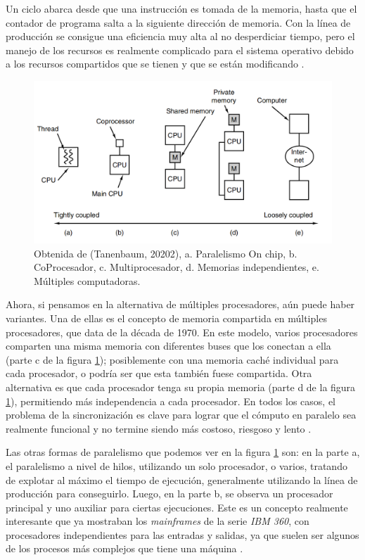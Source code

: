 \documentclass[letterpaper,12pt,oneside]{book}
\begin{document}
        Un ciclo abarca desde que una instrucción es tomada de la memoria, hasta que el contador
		de programa salta a la siguiente dirección de memoria. Con la línea de producción se consigue una eficiencia muy alta al no desperdiciar tiempo, pero el manejo de los recursos es realmente complicado para el sistema operativo debido a los recursos compartidos que
		se tienen y que se están modificando \cite[p.421]{null_essentials_2003}.
		
		\begin{figure}[h]
 			\centering
			\includegraphics[scale=0.3]{media/ParalelismoTanenbaun.png}
			\caption{Obtenida de (Tanenbaum, 20202), a. Paralelismo On chip, b. CoProcesador, c. Multiprocesador, d. Memorias independientes, e. Múltiples computadoras.}%
			\label{fig:Paralelismo}
		\end{figure}
		
		Ahora, si pensamos en la alternativa de múltiples procesadores, aún puede haber variantes. Una de ellas es el concepto de memoria compartida
		en múltiples procesadores, que data de la década de 1970. En este modelo, varios procesadores comparten una misma memoria con diferentes
		buses que los conectan a ella (parte c de la figura \ref{fig:Paralelismo}); posiblemente con una memoria caché individual para cada procesador, o 
		podría ser
		que esta también fuese compartida. Otra alternativa es que cada procesador tenga su propia memoria (parte d de la figura 
		\ref{fig:Paralelismo}), permitiendo más independencia
		a cada procesador. En todos los casos, el problema de la sincronización es clave para lograr que el cómputo en paralelo sea realmente funcional
		y no termine siendo más costoso, riesgoso y lento \cite{null_essentials_2003}.
		
		Las otras formas de paralelismo que podemos ver en la figura \ref{fig:Paralelismo} son: en la parte a, el paralelismo
		a nivel de hilos, utilizando un solo procesador, o varios, tratando de explotar al máximo el tiempo de ejecución, generalmente 
		utilizando la línea de producción para conseguirlo. Luego, en la parte b, se observa un procesador principal y uno auxiliar para ciertas ejecuciones. Este es un concepto realmente interesante que ya mostraban
		los \textit{mainframes} de la serie \textit{IBM 360}, con procesadores independientes para las entradas y salidas, ya que suelen ser algunos de los procesos más
		complejos que tiene una máquina \cite{tanenbaum_structured_2013}.
        
\end{document}
